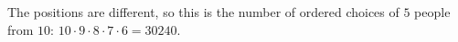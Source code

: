 The positions are different, so this is the number of ordered choices of $5$ people from $10$: $10\cdot9\cdot8\cdot7\cdot6=\boxed{30240}$.
